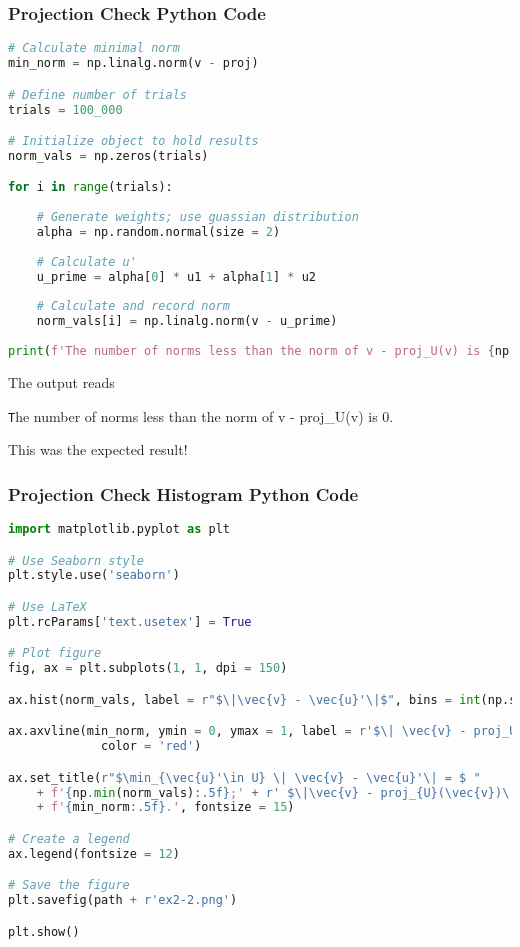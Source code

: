 \documentclass{beamer}
\begin{document}
\begin{frame}[fragile]
\frametitle{Projection Check Python Code}
\begin{lstlisting}[language=Python]
# Calculate minimal norm
min_norm = np.linalg.norm(v - proj)

# Define number of trials
trials = 100_000

# Initialize object to hold results
norm_vals = np.zeros(trials)

for i in range(trials):
    
    # Generate weights; use guassian distribution
    alpha = np.random.normal(size = 2)
    
    # Calculate u'
    u_prime = alpha[0] * u1 + alpha[1] * u2
    
    # Calculate and record norm
    norm_vals[i] = np.linalg.norm(v - u_prime)
    
print(f'The number of norms less than the norm of v - proj_U(v) is {np.sum(norm_vals < min_norm)}.')
\end{lstlisting}
The output reads
\begin{center}
\texttt
The number of norms less than the norm of v - proj\_U(v) is 0.
\end{center}
This was the expected result!
\end{frame}

\begin{frame}[fragile]
\frametitle{Projection Check Histogram Python Code}

\begin{lstlisting}[language=Python]
import matplotlib.pyplot as plt

# Use Seaborn style
plt.style.use('seaborn')

# Use LaTeX
plt.rcParams['text.usetex'] = True

# Plot figure
fig, ax = plt.subplots(1, 1, dpi = 150)

ax.hist(norm_vals, label = r"$\|\vec{v} - \vec{u}'\|$", bins = int(np.sqrt(trials)))

ax.axvline(min_norm, ymin = 0, ymax = 1, label = r'$\| \vec{v} - proj_U(\vec{v})\|$', 
             color = 'red')

ax.set_title(r"$\min_{\vec{u}'\in U} \| \vec{v} - \vec{u}'\| = $ " 
	+ f'{np.min(norm_vals):.5f};' + r' $\|\vec{v} - proj_{U}(\vec{v})\| = $ ' 
	+ f'{min_norm:.5f}.', fontsize = 15)

# Create a legend
ax.legend(fontsize = 12)

# Save the figure
plt.savefig(path + r'ex2-2.png')

plt.show()
\end{lstlisting}
\end{frame}
\end{document}
